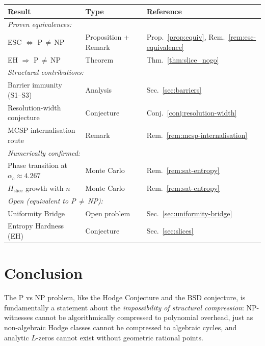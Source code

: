 \documentclass[aps,prd,twocolumn,superscriptaddress,nofootinbib]{revtex4-2}
\theoremstyle{definition}
\theoremstyle{remark}
\newcommand{\NP}{\mathrm{NP}}
\newcommand{\PP}{\mathrm{P}}
\begin{document}
\begin{center}
\begin{tabular}{|l|l|l|}
\hline
\textbf{Result} & \textbf{Type} & \textbf{Reference} \\
\hline
\hline
\multicolumn{3}{|l|}{\textit{Proven equivalences:}} \\
\hline
ESC $\Leftrightarrow$ P\,$\neq$\,NP & Proposition + Remark & Prop.~\ref{prop:equiv}, Rem.~\ref{rem:esc-equivalence} \\
EH $\Rightarrow$ P\,$\neq$\,NP & Theorem & Thm.~\ref{thm:slice_nogo} \\
\hline
\multicolumn{3}{|l|}{\textit{Structural contributions:}} \\
\hline
Barrier immunity (S1--S3) & Analysis & Sec.~\ref{sec:barriers} \\
Resolution-width conjecture & Conjecture & Conj.~\ref{conj:resolution-width} \\
MCSP internalisation route & Remark & Rem.~\ref{rem:mcsp-internalisation} \\
\hline
\multicolumn{3}{|l|}{\textit{Numerically confirmed:}} \\
\hline
Phase transition at $\alpha_c \approx 4.267$ & Monte Carlo & Rem.~\ref{rem:sat-entropy} \\
$H_{\mathrm{slice}}$ growth with $n$ & Monte Carlo & Rem.~\ref{rem:sat-entropy} \\
\hline
\multicolumn{3}{|l|}{\textit{Open (equivalent to P\,$\neq$\,NP):}} \\
\hline
Uniformity Bridge & Open problem & Sec.~\ref{sec:uniformity-bridge} \\
Entropy Hardness (EH) & Conjecture & Sec.~\ref{sec:slices} \\
\hline
\end{tabular}
\end{center}

\section{Conclusion}
\label{sec:conclusion}

The $\PP$ vs $\NP$ problem, like the Hodge Conjecture and the BSD conjecture, is fundamentally a statement about the \textit{impossibility of structural compression}: NP-witnesses cannot be algorithmically compressed to polynomial overhead, just as non-algebraic Hodge classes cannot be compressed to algebraic cycles, and analytic $L$-zeros cannot exist without geometric rational points.
\end{document}
